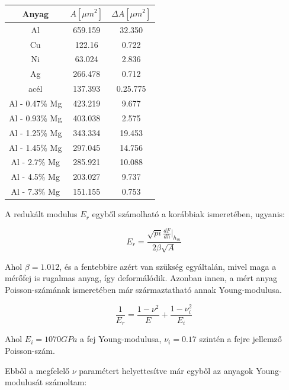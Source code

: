 \documentclass[a4paper,12pt]{article}
\begin{document}
\begin{center}
\begin{tabular}{|c|c|c|}
\hline
Anyag & $A [\mu m^{2}]$ & $\Delta A [\mu m^{2}]$ \\
\hline
Al &659.159 &32.350\\
\hline
Cu &122.16 &0.722\\
\hline
Ni& 63.024 &2.836\\
\hline
Ag &266.478 &0.712\\
\hline
acél& 137.393 &0.25.775\\
\hline
Al - 0.47$\%$ Mg &423.219 &9.677\\
\hline
Al - 0.93$\%$ Mg &403.038 &2.575\\
\hline
Al - 1.25$\%$ Mg &343.334 &19.453\\
\hline
Al - 1.45$\%$ Mg &297.045 &14.756\\
\hline
Al - 2.7$\%$ Mg &285.921 &10.088\\
\hline
Al - 4.5$\%$ Mg &203.027 &9.737\\
\hline
Al - 7.3$\%$ Mg &151.155 &0.753\\
\hline
\end{tabular}
\end{center}

\par A redukált modulus $E_{r}$ egyből számolható a korábbiak ismeretében, ugyanis:

\begin{equation*}
E_{r} = \frac{\sqrt{pi}\frac{dF}{dh}|_{h_{m}}}{2\beta\sqrt{A}}
\end{equation*}

\par Ahol $\beta = 1.012$, és a fentebbire azért van szükség egyáltalán, mivel maga a mérőfej is rugalmas anyag, így deformálódik. Azonban innen, a mért anyag Poisson-számának ismeretében már származtatható annak Young-modulusa.

\begin{equation*}
\frac{1}{E_{r}} = \frac{1 - \nu^{2}}{E} + \frac{1-\nu^{2}_{i}}{E_{i}}
\end{equation*}

\par Ahol $E_{i} = 1070 GPa$ a fej Young-modulusa, $\nu_{i} = 0.17$ szintén a fejre jellemző Poisson-szám.

\par Ebből a megfelelő $\nu$ paramétert helyettesítve már egyből az anyagok Young-modulusát számoltam:
\end{document}

